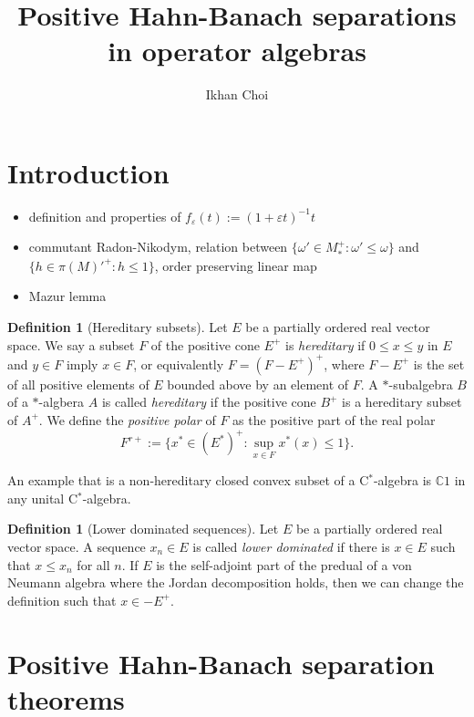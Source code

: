 \documentclass[a4paper]{amsart}
\title{Positive Hahn-Banach separations in operator algebras}
\author{Ikhan Choi}
\newcommand{\e}{\varepsilon}
\theoremstyle{plain}
\theoremstyle{definition}
\newtheorem{defn}[thm]{Definition}
\begin{document}
\begin{abstract}

\end{abstract}

\maketitle

\section{Introduction}






\begin{itemize}
\item definition and properties of $f_\e(t):=(1+\e t)^{-1}t$
\item commutant Radon-Nikodym, relation between $\{\omega'\in M_*^+:\omega'\le\omega\}$ and $\{h\in\pi(M)'^+:h\le1\}$, order preserving linear map
\item Mazur lemma
\end{itemize}


\begin{defn}[Hereditary subsets]
Let $E$ be a partially ordered real vector space.
We say a subset $F$ of the positive cone $E^+$ is \emph{hereditary} if $0\le x\le y$ in $E$ and $y\in F$ imply $x\in F$, or equivalently $F=(F-E^+)^+$, where $F-E^+$ is the set of all positive elements of $E$ bounded above by an element of $F$.
A $*$-subalgebra $B$ of a $*$-algbera $A$ is called \emph{hereditary} if the positive cone $B^+$ is a hereditary subset of $A^+$.
We define the \emph{positive polar} of $F$ as the positive part of the real polar
\[F^{r+}:=\{x^*\in(E^*)^+:\sup_{x\in F}x^*(x)\le1\}.\]
\end{defn}
An example that is a non-hereditary closed convex subset of a C$^*$-algebra is $\mathbb{C}1$ in any unital C$^*$-algebra.


\begin{defn}[Lower dominated sequences]
Let $E$ be a partially ordered real vector space.
A sequence $x_n\in E$ is called \emph{lower dominated} if there is $x\in E$ such that $x\le x_n$ for all $n$.
If $E$ is the self-adjoint part of the predual of a von Neumann algebra where the Jordan decomposition holds, then we can change the definition such that $x\in -E^+$.
\end{defn}

\section{Positive Hahn-Banach separation theorems}
\end{document}
